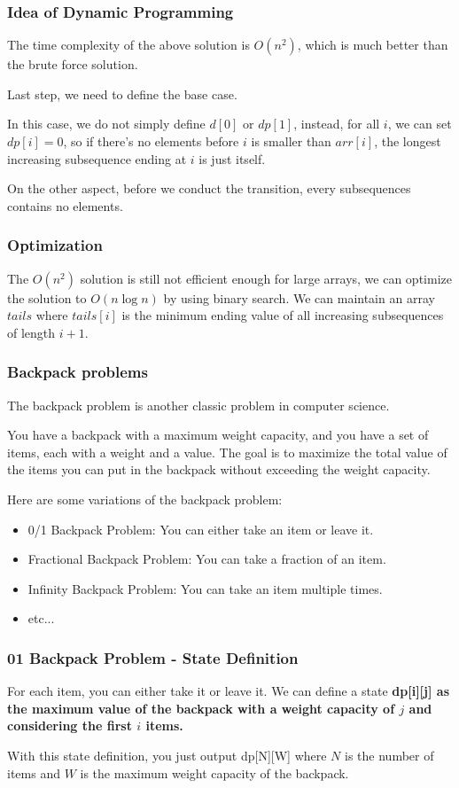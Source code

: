 \documentclass[xcolor=dvipsnames]{beamer}
\begin{document}
    \begin{frame}
        \frametitle{Idea of Dynamic Programming}
        The time complexity of the above solution is $O(n^2)$, which is much better than the brute force solution.

        Last step, we need to define the base case.

        In this case, we do not simply define $d[0]$ or $dp[1]$, instead, for all $i$, we can set $dp[i] = 0$, so if there's no elements before $i$ is smaller than $arr[i]$, the longest increasing subsequence ending at $i$ is just itself.

        On the other aspect, before we conduct the transition, every subsequences contains no elements.
    \end{frame}

    \begin{frame}
        \frametitle{Optimization}
        The $O(n^2)$ solution is still not efficient enough for large arrays, we can optimize the solution to $O(n \log n)$ by using binary search.
        We can maintain an array $tails$ where $tails[i]$ is the minimum ending value of all increasing subsequences of length $i+1$.
    \end{frame}
    
    \begin{frame}
        \frametitle{Backpack problems}
        The backpack problem is another classic problem in computer science.

        You have a backpack with a maximum weight capacity, and you have a set of items, each with a weight and a value.
        The goal is to maximize the total value of the items you can put in the backpack without exceeding the weight capacity.

        Here are some variations of the backpack problem:
        \begin{itemize}
            \item 0/1 Backpack Problem: You can either take an item or leave it.
            \item Fractional Backpack Problem: You can take a fraction of an item.
            \item Infinity Backpack Problem: You can take an item multiple times.
            \item etc...
        \end{itemize}
    \end{frame}

    \begin{frame}
        \frametitle{01 Backpack Problem - State Definition}
        For each item, you can either take it or leave it.
        We can define a state \textbf{dp[i][j] as the maximum value of the backpack with a weight capacity of $j$ and considering the first $i$ items.}

        With this state definition, you just output dp[N][W] where $N$ is the number of items and $W$ is the maximum weight capacity of the backpack.
    \end{frame}
\end{document}
